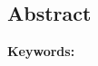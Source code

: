 \begin{otherlanguage}{english}
{}
\chapter*{Abstract}

\lipsum[1-2]

\vspace{1cm}

\textbf{Keywords:} \keywordsEn

\vfill
\end{otherlanguage}

